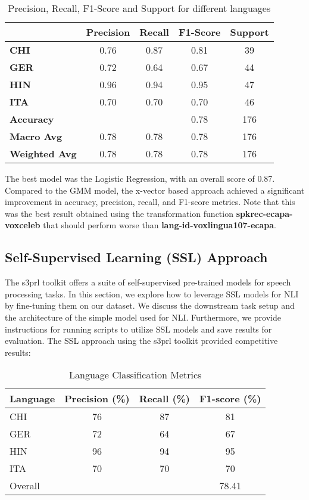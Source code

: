 \documentclass{Interspeech2024}
\begin{document}
\begin{table}[h!]
  \centering
  \begin{tabular}{lcccc}
  \hline
   & \textbf{Precision} & \textbf{Recall} & \textbf{F1-Score} & \textbf{Support} \\
  \hline
  \textbf{CHI} & 0.76 & 0.87 & 0.81 & 39 \\
  \textbf{GER} & 0.72 & 0.64 & 0.67 & 44 \\
  \textbf{HIN} & 0.96 & 0.94 & 0.95 & 47 \\
  \textbf{ITA} & 0.70 & 0.70 & 0.70 & 46 \\
  \hline
  \textbf{Accuracy} &  &  & 0.78 & 176 \\
  \textbf{Macro Avg} & 0.78 & 0.78 & 0.78 & 176 \\
  \textbf{Weighted Avg} & 0.78 & 0.78 & 0.78 & 176 \\
  \hline
  \end{tabular}
  \caption{Precision, Recall, F1-Score and Support for different languages}
  \label{table:metrics}
  \end{table}

The best model was the Logistic Regression, with an overall score of 0.87. Compared to the GMM model, the x-vector based approach achieved a significant improvement in accuracy, precision, recall, and F1-score metrics.
Note that this was the best result obtained using the transformation function \textbf{spkrec-ecapa-voxceleb} that should perform worse than \textbf{lang-id-voxlingua107-ecapa}.

\subsection{Self-Supervised Learning (SSL) Approach}
The s3prl toolkit offers a suite of self-supervised pre-trained models for speech processing tasks. In this section, we explore how to leverage SSL models for NLI by fine-tuning them on our dataset. We discuss the downstream task setup and the architecture of the simple model used for NLI. Furthermore, we provide instructions for running scripts to utilize SSL models and save results for evaluation.
The SSL approach using the s3prl toolkit provided competitive results:
\begin{table}[htbp]
  \centering
  \caption{Language Classification Metrics}
    \begin{tabular}{lccc}
    \toprule
    Language & Precision (\%) & Recall (\%) & F1-score (\%) \\
    \midrule
    CHI   & 76 & 87 & 81 \\
    GER   & 72 & 64 & 67 \\
    HIN   & 96 & 94 & 95 \\
    ITA   & 70 & 70 & 70 \\
    \midrule
    Overall & & & 78.41 \\
    \bottomrule
    \end{tabular}%
  \label{tab:metrics}%
\end{table}%
\end{document}
